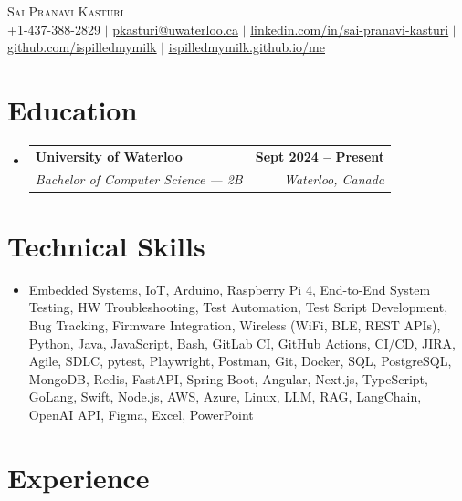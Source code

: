 \documentclass[letterpaper,10pt]{article}
\makeatletter
\newcommand{\resumeSubheading}[4]{
  \vspace{-1pt}\item
    \begin{tabular*}{1.0\textwidth}[t]{l@{\extracolsep{\fill}}r}
      \textbf{#1} & \textbf{\small #2} \\
      \textit{\small#3} & \textit{\small #4} \\[-2pt]
    \end{tabular*}\vspace{-7pt}
}
\newcommand{\resumeSubHeadingListStart}{\begin{itemize}[leftmargin=0.0in, label={}]}
\newcommand{\resumeSubHeadingListEnd}{\end{itemize}}
\makeatother
\begin{document}

\vspace{-28pt}
\begin{center}
    {\Huge \scshape Sai Pranavi Kasturi} \\
    \small +1-437-388-2829 $|$ \underline{pkasturi@uwaterloo.ca} $|$
    \href{https://linkedin.com/in/sai-pranavi-kasturi-704807298}{\underline{linkedin.com/in/sai-pranavi-kasturi}} $|$
    \href{https://github.com/ispilledmymilk}{\underline{github.com/ispilledmymilk}} $|$
    \href{https://ispilledmymilk.github.io/me/}{\underline{ispilledmymilk.github.io/me}}
    \vspace{-10pt}
\end{center}

\vspace{-10pt}
\section{Education}
  \resumeSubHeadingListStart
    \resumeSubheading
      {University of Waterloo}{Sept 2024 -- Present}
      {Bachelor of Computer Science --- 2B}{Waterloo, Canada}
  \resumeSubHeadingListEnd
\vspace{-8pt}

\section{Technical Skills}
\begin{itemize}[leftmargin=0.05in, label={}]
  \small\item{
    Embedded Systems, IoT, Arduino, Raspberry Pi 4, End-to-End System Testing, HW Troubleshooting, Test Automation, Test Script Development, Bug Tracking, Firmware Integration, Wireless (WiFi, BLE, REST APIs), Python, Java, JavaScript, Bash, GitLab CI, GitHub Actions, CI/CD, JIRA, Agile, SDLC, pytest, Playwright, Postman, Git, Docker, SQL, PostgreSQL, MongoDB, Redis, FastAPI, Spring Boot, Angular, Next.js, TypeScript, GoLang, Swift, Node.js, AWS, Azure, Linux, LLM, RAG, LangChain, OpenAI API, Figma, Excel, PowerPoint
  }
\end{itemize}
\vspace{-18pt}

\vspace{1.20pt}
\section{Experience}
\end{document}

